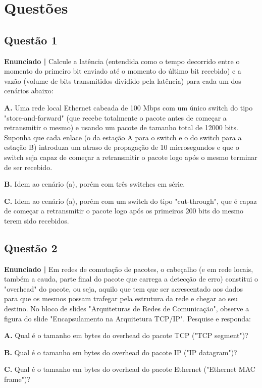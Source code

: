\section{Questões}\label{sec:questoes}

\subsection{Questão 1}
\textbf{Enunciado | }
Calcule a latência (entendida como o tempo decorrido entre o momento do primeiro
bit enviado até o momento do último bit recebido) e a vazão (volume de bits
transmitidos dividido pela latência) para cada um dos cenários abaixo: 

\textbf{A.} Uma rede local Ethernet cabeada de 100 Mbps com um único switch do tipo
"store-and-forward" (que recebe totalmente o pacote antes de começar a
retransmitir o mesmo) e usando um pacote de tamanho total de 12000 bits. Suponha
que cada enlace (o da estação A para o switch e o do switch para a estação B)
introduza um atraso de propagação de 10 microsegundos e que o switch seja capaz
de começar a retransmitir o pacote logo após o mesmo terminar de ser recebido.



\textbf{B.} Idem ao cenário (a), porém com três switches em série.

\textbf{C.} Idem ao cenário (a), porém com um switch do tipo "cut-through", que é capaz
de começar a retransmitir o pacote logo após os primeiros 200 bits do mesmo
terem sido recebidos.

\subsection{Questão 2}
\textbf{Enunciado | }
Em redes de comutação de pacotes, o cabeçalho (e em rede locais, também a cauda,
parte final do pacote que carrega a detecção de erro) constitui o "overhead" do
pacote, ou seja, aquilo que tem que ser acrescentado aos dados para que os
mesmos possam trafegar pela estrutura da rede e chegar ao seu destino. No bloco
de slides "Arquiteturas de Redes de Comunicação", observe a figura do slide
"Encapsulamento na Arquitetura TCP/IP". Pesquise e responda:

\textbf{A.} Qual é o tamanho em bytes do overhead do pacote TCP ("TCP segment")?

\textbf{B.} Qual é o tamanho em bytes do overhead do pacote IP ("IP datagram")?

\textbf{C.} Qual é o tamanho em bytes do overhead do pacote Ethernet ("Ethernet MAC
frame")?


